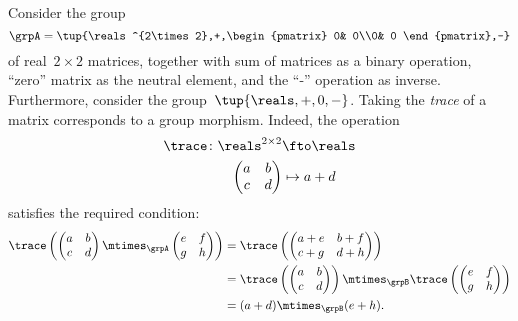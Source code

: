 \begin{example}
    Consider the group
    \begin{equation}
        \grpA=\tup{\reals^{2\times 2},+,\begin{pmatrix}
                                            0& 0\\0& 0
        \end{pmatrix},-}
    \end{equation} of real~$2\times 2$ matrices, together with sum of matrices as a binary operation, ``zero'' matrix as the neutral element, and the ``-'' operation as inverse.
    Furthermore, consider the group~$\tup{\reals,+,0,-}$. Taking the \emph{trace} of a matrix corresponds to a group morphism. Indeed, the operation
    \begin{equation*}
        \begin{aligned}
            \trace\colon \reals^{2\times 2}&\fto \reals\\
            \begin{pmatrix}
                a & b \\
                c & d
            \end{pmatrix}&\mapsto a+d
        \end{aligned}
    \end{equation*}
    satisfies the required condition:
    \begin{equation*}
        \begin{aligned}
            \trace \left(\begin{pmatrix}
                             a & b \\
                             c & d
            \end{pmatrix} \mtimes_\grpA \begin{pmatrix}
                                            e & f \\
                                            g & h
            \end{pmatrix} \right)&=\trace \left( \begin{pmatrix}
                                                     a+e & b+f \\
                                                     c+g & d+h
            \end{pmatrix}\right)\\
            &=\trace \left( \begin{pmatrix}
                                a & b \\
                                c & d
            \end{pmatrix}\right)\mtimes_\grpB \trace \left( \begin{pmatrix}
                                                                e & f \\
                                                                g & h
            \end{pmatrix}\right)\\
            &=(a+d)\mtimes_\grpB (e+h).
        \end{aligned}
    \end{equation*}
\end{example}
